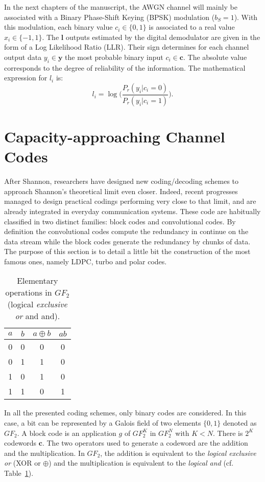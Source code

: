 In the next chapters of the manuscript, the AWGN channel will mainly be
associated with a Binary Phase-Shift Keying (BPSK) modulation ($b_S = 1$). With
this modulation, each binary value $c_i \in \{0,1\}$ is associated to a real
value $x_i \in \{-1,1\}.$ The $\bm{l}$ outputs estimated by the digital
demodulator are given in the form of a Log Likelihood Ratio (LLR). Their sign
determines for each channel output data $y_i \in \bm{y}$ the most probable
binary input $c_i \in \bm{c}$. The absolute value corresponds to the degree of
reliability of the information. The mathematical expression for $l_i$ is:
\begin{equation*}
l_i = \log{\Big(\frac{P_r(y_i|c_i = 0)}{P_r(y_i|c_i = 1)}\Big)}.
\end{equation*}

\section{Capacity-approaching Channel Codes}

After Shannon, researchers have designed new coding/decoding schemes to approach
Shannon's theoretical limit even closer. Indeed, recent progresses managed to
design practical codings performing very close to that limit, and are already
integrated in everyday communication systems. These code are habitually
classified in two distinct families: block codes and convolutional codes. By
definition the convolutional codes compute the redundancy in continue on the
data stream while the block codes generate the redundancy by chunks of data.
The purpose of this section is to detail a little bit the construction of the
most famous ones, namely LDPC, turbo and polar codes.

\begin{table}[htp]
  \centering
  \caption{Elementary operations in $GF_2$ (logical \emph{exclusive or} and
    {and}).}
  \label{tab:ctx_gf2_operations}
   \begin{tabular}{c c c c}
   $a$ & $b$ & $a \oplus b$ & $ab$ \\
    \hline
    \hline
    0 & 0 & 0 & 0 \\
    0 & 1 & 1 & 0 \\
    1 & 0 & 1 & 0 \\
    1 & 1 & 0 & 1 \\
  \end{tabular}
\end{table}

In all the presented coding schemes, only binary codes are considered. In this
case, a bit can be represented by a Galois field of two elements $\{0, 1\}$
denoted as $GF_2$. A block code is an application $g$ of $GF_2^K$ in $GF_2^N$
with $K < N$. There is $2^K$ codewords $\bm{c}$. The two operators used to
generate a codeword are the addition and the multiplication. In $GF_2$, the
addition is equivalent to the \emph{logical exclusive or} (XOR or $\oplus$) and
the multiplication is equivalent to the \emph{logical and} (cf.
Table~\ref{tab:ctx_gf2_operations}).

